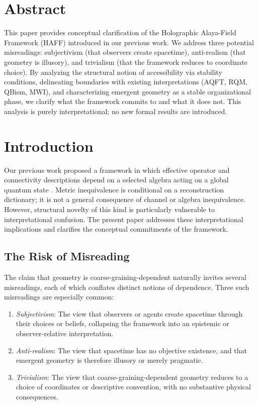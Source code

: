 \documentclass[12pt,a4paper,openany]{book}
\begin{document}
\bigskip

\section*{Abstract}
This paper provides conceptual clarification of the Holographic Alaya-Field Framework (HAFF) introduced in our previous work. 
We address three potential misreadings: subjectivism (that observers create spacetime), anti-realism (that geometry is illusory), and trivialism (that the framework reduces to coordinate choice). 
By analyzing the structural notion of accessibility via stability conditions, delineating boundaries with existing interpretations (AQFT, RQM, QBism, MWI), and characterizing emergent geometry as a stable organizational phase, we clarify what the framework commits to and what it does not. 
This analysis is purely interpretational; no new formal results are introduced.


\section{Introduction}
\label{B-sec:intro}

Our previous work proposed a framework in which effective operator and connectivity descriptions depend on a selected algebra acting on a global quantum state \cite{Liu2026}.  Metric inequivalence is conditional on a reconstruction dictionary; it is not a general consequence of channel or algebra inequivalence.
However, structural novelty of this kind is particularly vulnerable to interpretational confusion. 
The present paper addresses these interpretational implications and clarifies the conceptual commitments of the framework.

\subsection{The Risk of Misreading}

The claim that geometry is coarse-graining-dependent naturally invites several misreadings, each of which conflates distinct notions of dependence. 
Three such misreadings are especially common:

\begin{enumerate}
\item \emph{Subjectivism}: The view that observers or agents create spacetime through their choices or beliefs, collapsing the framework into an epistemic or observer-relative interpretation.
\item \emph{Anti-realism}: The view that spacetime has no objective existence, and that emergent geometry is therefore illusory or merely pragmatic.
\item \emph{Trivialism}: The view that coarse-graining-dependent geometry reduces to a choice of coordinates or descriptive convention, with no substantive physical consequences.
\end{enumerate}
\end{document}

